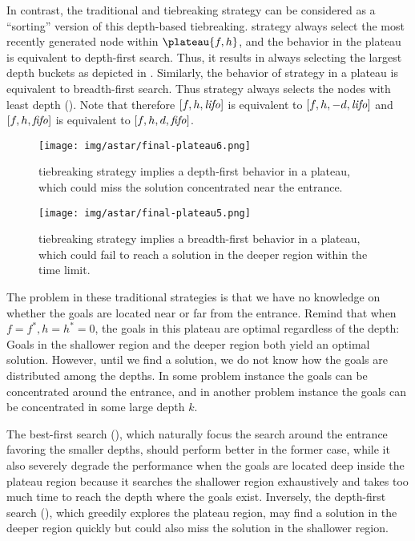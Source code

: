 In contrast, the traditional \lifo and \fifo tiebreaking strategy can be
considered as a ``sorting'' version of this depth-based tiebreaking.
\lifo strategy always select the most recently generated node
within $\plateau{f,h}$, and the behavior in the plateau is equivalent to depth-first search.
Thus, it results in always selecting the largest depth
buckets as depicted in .
Similarly, the behavior of \fifo strategy 
in a plateau is equivalent to breadth-first search. Thus \fifo strategy
always selects the nodes with least depth ().
Note that therefore $[f,h,{\mbox{\textit{lifo}}}]$ is equivalent to $[f,h,-d,{\mbox{\textit{lifo}}}]$ and
$[f,h,{\mbox{\textit{fifo}}}]$ is equivalent to $[f,h,d,{\mbox{\textit{fifo}}}]$.

\begin{figure}[htbp]
 \texttt{[image: img/astar/final-plateau6.png]}
 \caption{\lifo tiebreaking strategy implies a depth-first behavior in a
 plateau, which could miss the solution concentrated near the entrance.}
 \label{fig:plateau-depiction-lifo}
\end{figure}

\begin{figure}[htbp]
 \texttt{[image: img/astar/final-plateau5.png]}
 \caption{\fifo tiebreaking strategy implies a breadth-first behavior in a
 plateau, which could fail to reach a solution in the deeper region
 within the time limit.}
 \label{fig:plateau-depiction-fifo}
\end{figure}

The problem in these traditional strategies is that we have no knowledge
on whether the goals are located near or far from the entrance. Remind
that when $f=f^*, h=h^*=0$, the goals in this plateau are optimal
regardless of the depth: Goals in the shallower region and the deeper
region both yield an optimal solution. However, until we find a
solution, we do not know how the goals are distributed among the
depths. In some problem instance the goals can be concentrated around
the entrance, and in another problem instance the goals can be
concentrated in some large depth $k$.


The best-first search (\fifo), which naturally focus the search around
the entrance favoring the smaller depths, should perform better in the
former case, while it also severely degrade the performance when the
goals are located deep inside the plateau region because it searches the
shallower region exhaustively and takes too much time to reach the depth
where the goals exist.
Inversely, the depth-first search (\lifo), which greedily explores the
plateau region, may find a solution in the deeper region quickly but
could also miss the solution in the shallower region.

